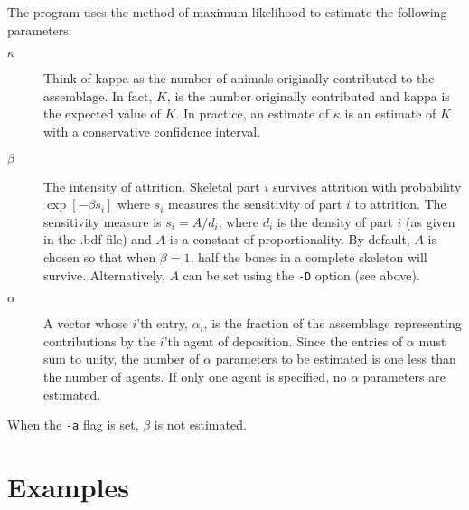 The program uses the method of maximum likelihood to estimate the
following parameters: 
\begin{description}
  
\item[$\kappa$] Think of kappa as the number of animals originally contributed
  to the assemblage.  In fact, $K$, is the number originally contributed and
  kappa is the expected value of $K$.  In practice, an estimate of $\kappa$ is
  an estimate of $K$ with a conservative confidence interval.
  
\item[$\beta$] The intensity of attrition.  Skeletal part $i$ survives
  attrition with probability $\exp[-\beta s_i]$ where $s_i$ measures the
  sensitivity of part $i$ to attrition.  The sensitivity measure is $s_i =
  A/d_i$, where $d_i$ is the density of part $i$ (as given in the .bdf file)
  and $A$ is a constant of proportionality.  By default, $A$ is chosen so that
  when $\beta=1$, half the bones in a complete skeleton will survive.
  Alternatively, $A$ can be set using the \texttt{-D} option (see above).
  
\item[$\alpha$] A vector whose $i$'th entry, $\alpha_i$, is the fraction of
  the assemblage representing contributions by the $i$'th agent of deposition.
  Since the entries of $\alpha$ must sum to unity, the number of $\alpha$
  parameters to be estimated is one less than the number of agents.  If only
  one agent is specified, no $\alpha$ parameters are estimated.
\end{description}

When the \texttt{-a} flag is set, $\beta$ is not estimated.

\section{Examples}

